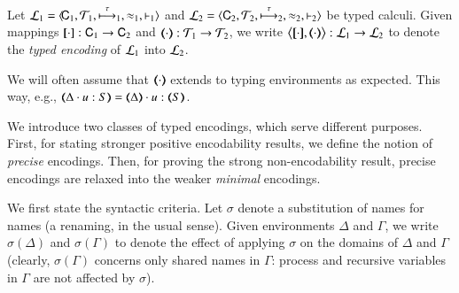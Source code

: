 \begin{definition}\rm
\label{def:tenc}
        Let  
        $\mathcal{L}_1=\langle \!\mathsf{C}_1, {\cal{T}}_1, \stackrel{\tau}{\longmapsto}_1, \approx_1, \vdash_1 \rangle$
        and
        $\mathcal{L}_2=\langle \mathsf{C}_2, {\cal{T}}_2, \stackrel{\tau}{\longmapsto}_2, \approx_2, \vdash_2 \rangle$
         be typed calculi. 
	Given mappings $[\!\![\cdot]\!\!]: \mathsf{C}_1 \to \mathsf{C}_2$ and
	$(\!\!\langle\cdot\rangle\!\!): {\cal{T}}_1 \to {\cal{T}}_2$, 
	we write 
		$\enco{\map{\cdot}, \mapt{\cdot}} : 
	\tyl{L}_1 \to \tyl{L}_2$ to denote the \emph{typed encoding} of $\mathcal{L}_1$ into $\mathcal{L}_2$.
\end{definition}

\smallskip 

\noi We will often assume that  $(\!\!\langle\cdot\rangle\!\!)$ extends to typing
environments as expected. This way, e.g., $\mapt{\Delta \cat u:S} = \mapt{\Delta} \cat u:\mapt{S}$.

We introduce two classes of typed encodings, which 
serve different purposes. 
First, for stating stronger positive encodability results, %
we define the notion of {\em precise} encodings.
Then, 
for proving the strong non-encodability result, %
precise encodings are relaxed into the weaker {\em minimal} encodings. 

We first state the 
syntactic criteria. 
Let $\sigma$ denote a substitution of names for names (a renaming, in the usual sense). Given environments $\Delta$ and $\Gamma$,
we write $\sigma(\Delta)$ and $\sigma(\Gamma)$ to denote the effect of applying $\sigma$ on the 
domains of $\Delta$ and $\Gamma$
(clearly, $\sigma(\Gamma)$ concerns only shared names in $\Gamma$: process and recursive variables in $\Gamma$ are not affected by $\sigma$). 

\smallskip 

